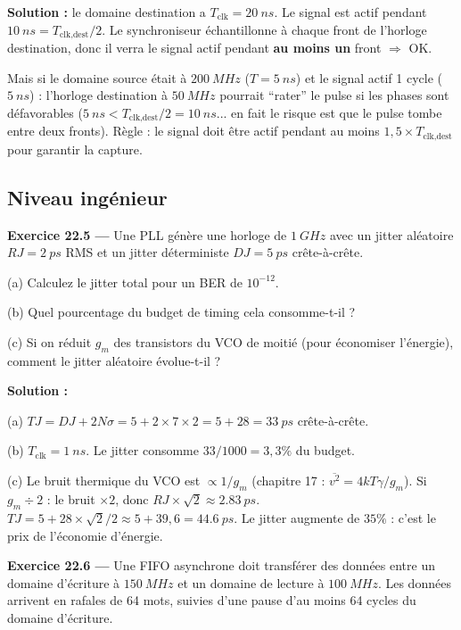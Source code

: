 \documentclass[12pt,a4paper,twoside]{book}
\begin{document}
\begin{pratique}
\textbf{Solution :} le domaine destination a $T_{\text{clk}} = \SI{20}{ns}$. Le signal est actif pendant $\SI{10}{ns} = T_{\text{clk,dest}}/2$. Le synchroniseur échantillonne à chaque front de l'horloge destination, donc il verra le signal actif pendant \textbf{au moins un} front $\Rightarrow$ OK.

Mais si le domaine source était à $\SI{200}{MHz}$ ($T = \SI{5}{ns}$) et le signal actif 1 cycle ($\SI{5}{ns}$) : l'horloge destination à $\SI{50}{MHz}$ pourrait ``rater'' le pulse si les phases sont défavorables ($\SI{5}{ns} < T_{\text{clk,dest}}/2 = \SI{10}{ns}$... en fait le risque est que le pulse tombe entre deux fronts). Règle : le signal doit être actif pendant au moins $1{,}5 \times T_{\text{clk,dest}}$ pour garantir la capture.
\end{pratique}

\subsection*{Niveau ingénieur}

\textbf{Exercice 22.5 ---} Une PLL génère une horloge de $\SI{1}{GHz}$ avec un jitter aléatoire $RJ = \SI{2}{ps}$ RMS et un jitter déterministe $DJ = \SI{5}{ps}$ crête-à-crête.

(a) Calculez le jitter total pour un BER de $10^{-12}$.

(b) Quel pourcentage du budget de timing cela consomme-t-il ?

(c) Si on réduit $g_m$ des transistors du VCO de moitié (pour économiser l'énergie), comment le jitter aléatoire évolue-t-il ?

\begin{pratique}
\textbf{Solution :}

(a) $TJ = DJ + 2N\sigma = 5 + 2\times7\times2 = 5 + 28 = \SI{33}{ps}$ crête-à-crête.

(b) $T_{\text{clk}} = \SI{1}{ns}$. Le jitter consomme $33/1000 = 3{,}3\%$ du budget.

(c) Le bruit thermique du VCO est $\propto 1/g_m$ (chapitre 17 : $\overline{v^2} = 4kT\gamma/g_m$). Si $g_m \div 2$ : le bruit $\times 2$, donc $RJ \times \sqrt{2} \approx \SI{2.83}{ps}$. $TJ = 5 + 28\times\sqrt{2}/2 \approx 5 + 39{,}6 = \SI{44.6}{ps}$. Le jitter augmente de $35\%$ : c'est le prix de l'économie d'énergie.
\end{pratique}

\textbf{Exercice 22.6 ---} Une FIFO asynchrone doit transférer des données entre un domaine d'écriture à $\SI{150}{MHz}$ et un domaine de lecture à $\SI{100}{MHz}$. Les données arrivent en rafales de 64 mots, suivies d'une pause d'au moins 64 cycles du domaine d'écriture.
\end{document}
